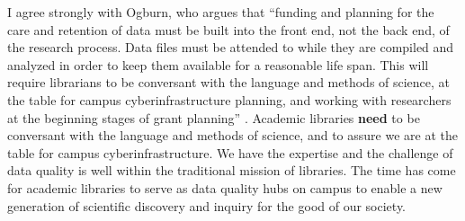\documentclass{acm_proc_article-sp}
\begin{document}
%

I agree strongly with Ogburn, who argues that ``funding and planning
for the care and retention of data must be built into the front end,
not the back end, of the research process. Data files must be attended
to while they are compiled and analyzed in order to keep them
available for a reasonable life span. This will require librarians to
be conversant with the language and methods of science, at the table
for campus cyberinfrastructure planning, and working with researchers
at the beginning stages of grant planning''
\cite{ogburn:imperative}. Academic libraries \textbf{need} to be
conversant with the language and methods of science, and to assure we
are at the table for campus cyberinfrastructure. We have the expertise
and the challenge of data quality is well within the traditional
mission of libraries. The time has come for academic libraries to
serve as data quality hubs on campus to enable a new generation of
scientific discovery and inquiry for the good of our society.

%
% 
\end{document}
